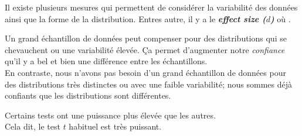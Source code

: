 \documentclass[10pt, french]{article}
\begin{document}
\begin{multicols*}{2}
\begin{definitionNOHFILLsub}
\begin{itemize}
\begin{center}
		\end{center}
\end{itemize}
\end{definitionNOHFILLsub}

Il existe plusieurs mesures qui permettent de considérer la variabilité des données ainsi que la forme de la distribution. Entres autre, il y a le \og \textit{\textbf{effect size ($d$)}} \fg{} où .

\begin{definitionNOHFILLsub}
Un grand échantillon de données peut compenser pour des distributions qui se chevauchent ou une variabilité élevée. Ça permet d'augmenter notre \textit{confiance} qu'il y a bel et bien une différence entre les échantillons. \\

En contraste, nous n'avons pas besoin d'un grand échantillon de données pour des distributions très distinctes ou avec une faible variabilité; nous sommes déjà confiants que les distributions sont différentes.
\end{definitionNOHFILLsub}

\begin{definitionNOHFILLsub}
Certains tests ont une puissance plus élevée que les autres. \\
Cela dit, le test $t$ habituel est très puissant.
\end{definitionNOHFILLsub}




\end{multicols*}
\end{document}
